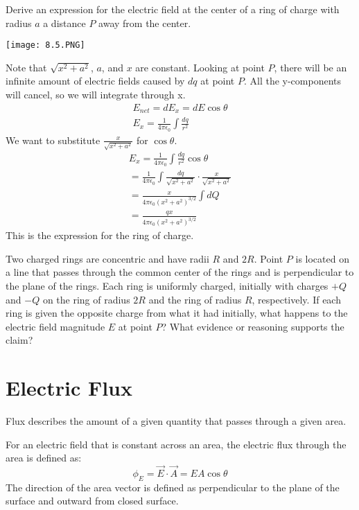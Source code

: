 \documentclass[../em.tex]{subfiles}
\begin{document}
\begin{example}
    Derive an expression for the electric field at the center of a ring of charge with radius $a$ a distance $P$ away from the center.
    \begin{center}
        \texttt{[image: 8.5.PNG]}
    \end{center}
    Note that $\sqrt{x^2+a^2}$, $a$, and $x$ are constant. 
    \smallbreak
    Looking at point $P$, there will be an infinite amount of electric fields caused by $dq$ at point $P$.
    \smallbreak
    All the y-components will cancel, so we will integrate through x.
    \begin{align*}
        E_{net}=dE_x=dE\cos\theta
        \\
        E_x=\frac{1}{4\pi\epsilon_0}\int\frac{dq}{r^2}
    \end{align*}
    We want to substitute $\frac{x}{\sqrt{x^2+a^2}}$ for $\cos\theta$.
    \begin{align*}
        E_x=\frac{1}{4\pi\epsilon_0}\int\frac{dq}{r^2}\cos\theta
        \\
        =\frac{1}{4\pi\epsilon_0}\int\frac{dq}{\sqrt{x^2+a^2}}\cdot\frac{x}{\sqrt{x^2+a^2}}
        \\
        =\frac{x}{4\pi\epsilon_0(x^2+a^2)^{3/2}}\int{dQ}
        \\
        =\frac{qx}{4\pi\epsilon_0(x^2+a^2)^{3/2}}
    \end{align*}
    This is the expression for the ring of charge. 
\end{example}

\ex Two charged rings are concentric and have radii $R$ and $2R$. Point $P$ is located on a line that passes through the common center of the rings and is perpendicular to the plane of the rings. Each ring is uniformly charged, initially with charges $+Q$ and $-Q$ on the ring of radius $2R$ and the ring of radius $R$, respectively. If each ring is given the opposite charge from what it had initially, what happens to the electric field magnitude $E$ at point $P$? What evidence or reasoning supports the claim?

\section{Electric Flux}
Flux describes the amount of a given quantity that passes through a given area.

For an electric field that is constant across an area, the electric flux through the area is defined as:
\[\phi_E=\vec{E}\cdot\vec{A}=EA\cos\theta\]
The direction of the area vector is defined as perpendicular to the plane of the surface and outward from closed surface.
\end{document}
